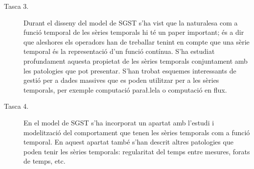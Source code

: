 \begin{description}








\item[Tasca 3.] Durant el disseny del model de SGST s'ha vist que la
  naturalesa com a funció temporal de les sèries temporals hi té un
  paper important; és a dir que aleshores els operadors han de
  treballar tenint en compte que una sèrie temporal és la
  representació d'un funció contínua. S'ha estudiat profundament
  aquesta propietat de les sèries temporals conjuntament amb les
  patologies que pot presentar. S'han trobat esquemes interessants de
  gestió per a dades massives que es poden utilitzar per a les sèries
  temporals, per exemple computació para\l.lela o computació en flux.



\item[Tasca 4.] En el model de SGST s'ha incorporat un apartat amb
  l'estudi i modelització del comportament que tenen les sèries
  temporals com a funció temporal. En aquest apartat també s'han
  descrit altres patologies que poden tenir les sèries temporals:
  regularitat del temps entre mesures, forats de temps, etc.



\end{description}
